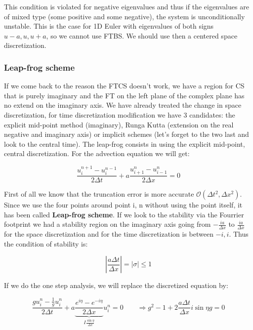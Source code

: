 This condition is violated for negative eigenvalues and thus if the eigenvalues are of mixed type (some positive and some negative), the system is unconditionally unstable. This is the case for 1D Euler with eigenvalues of both signs $u-a, u, u+a$, so we cannot use FTBS. We should use then a centered space discretization. 

\subsubsection{Leap-frog scheme}
If we come back to the reason the FTCS doesn't work, we have a region for CS that is purely imaginary and the FT on the left plane of the complex plane has no extend on the imaginary axis. We have already treated the change in space discretization, for time discretization modification we have 3 candidates: the explicit mid-point method (imaginary), Runga Kutta (extension on the real negative and imaginary axis) or implicit schemes (let's forget to the two last and look to the central time). 
The leap-frog consists in using the explicit mid-point, central discretization. For the advection equation we will get: 

\begin{equation}
\frac{u_{i}^{n+1} - u_{i}^{n-1}}{2\Delta t} + a \frac{u_{i+1}^{n} - u_{i-1}^{n}}{2\Delta x} = 0
\end{equation}

First of all we know that the truncation error is more accurate $\mathcal{O}(\Delta t^2, \Delta x^2)$. Since we use the four points around point i, n without using the point itself, it has been called \textbf{Leap-frog scheme}. If we look to the stability via the Fourrier footprint we had a stability region on the imaginary axis going from $-\frac{ia}{\Delta x}$ to $\frac{ia}{\Delta x}$ for the space discretization and for the time discretization is between $-i,i$. Thus the condition of stability is: 

\begin{equation}
\left|\frac{a\Delta t}{\Delta x} \right| = |\sigma | \leq 1
\end{equation}

If we do the one step analysis, we will replace the discretized equation by: 

\begin{equation}
\frac{g u^n_i - \frac{1}{g}u^n_i}{2\Delta t} + a \underbrace{\frac{e^{i\eta}- e^{-i\eta}}{2\Delta x}}_{I\frac{\sin \eta}{\Delta x}} u^n_i = 0 \qquad \Rightarrow g^2 - 1 + 2\frac{a \Delta t}{\Delta x} i \sin \eta g = 0
\end{equation}

